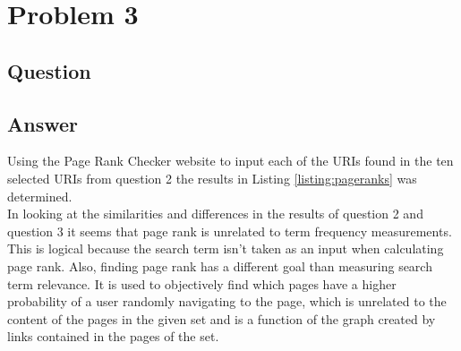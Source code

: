 \section{Problem 3}

\subsection{Question}



\subsection{Answer}
Using the Page Rank\cite{pagerank} Checker website to input each of the URIs found in the ten selected URIs from question 2 the results in Listing \ref{listing:pageranks} was determined.\\



In looking at the similarities and differences in the results of question 2 and question 3 it seems that page rank is unrelated to term frequency measurements. This is logical because the search term isn't taken as an input when calculating page rank. Also, finding page rank has a different goal than measuring search term relevance. It is used to objectively find which pages have a higher probability of a user randomly navigating to the page, which is unrelated to the content of the pages in the given set and is a function of the graph created by links contained in the pages of the set.